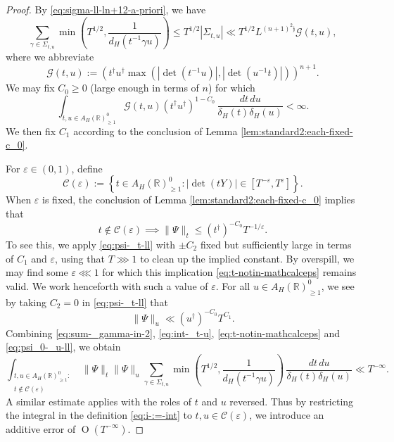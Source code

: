 \documentclass[reqno]{amsart}
\def\eps{\varepsilon}
\def\O{\operatorname{O}}
\theoremstyle{plain} \newtheorem{theorem} {Theorem}
\theoremstyle{definition} \newtheorem{definition} [theorem] {Definition}
\theoremstyle{itplain} %
\numberwithin{equation}{section}
\numberwithin{theorem}{section}
\renewcommand{\geq}{\geqslant}
\renewcommand{\leq}{\leqslant}
\begin{document}
\begin{proof}
  By \eqref{eq:sigma-ll-ln+12-a-priori}, we have
  \begin{equation}\label{eq:sum-_gamma-in-2}
    \sum _{\gamma \in \Sigma_{t,u}}
    \min \left( T^{1/2}, \frac{1}{d_H(t^{-1} \gamma u)} \right)
    \leq T^{1/2} |\Sigma_{t,u}| \ll
    T^{1/2}
    L^{(n+1)^2 \mathfrak{j}} \mathcal{G}(t,u),
  \end{equation}
  where we abbreviate
  \begin{equation*}
    \mathcal{G}(t,u)  := \left( t ^\dagger u ^\dagger \max(|\det(t^{-1} u)|, |\det(u^{-1} t)|) \right)^{n+1}.
  \end{equation*}
  We may fix $C_0 \geq 0$ (large enough in terms of $n$) for which
  \begin{equation}\label{eq:int-_t-u}
    \int _{t, u \in A_H(\mathbb{R})^0_{\geq 1}}
    \mathcal{G}(t,u) (t ^\dagger u ^\dagger )^{1- C_0} \, \frac{d t \, d u}{\delta_H(t) \delta_H(u)} < \infty.
  \end{equation}
  We then fix $C_1$ according to the conclusion of Lemma \ref{lem:standard2:each-fixed-c_0}.

  For $\eps \in (0,1)$, define
  \begin{equation*}
    \mathcal{C}(\eps) := \left\{ t \in A_H(\mathbb{R})^0_{\geq 1} : \left\lvert \det (t Y ) \right\rvert \in [T ^{- \eps }, T ^\eps ]\right\}.
  \end{equation*}
  When $\eps$ is fixed, the conclusion of Lemma \ref{lem:standard2:each-fixed-c_0} implies that
  \begin{equation}\label{eq:t-notin-mathcalceps}
    t \notin \mathcal{C}(\eps)
    \implies
    \|\Psi\|_t
    \leq
    (t ^\dagger )^{-C_0} T^{-1/\eps}.
  \end{equation}
  To see this, we apply \eqref{eq:psi-_t-ll} with $\pm C_2$ fixed but sufficiently large in terms of $C_1$ and $\eps $, using that $T \ggg 1$ to clean up the implied constant.  By overspill, we may find some $\eps \lll 1$ for which this implication \eqref{eq:t-notin-mathcalceps} remains valid.  We work henceforth with such a value of $\eps$.  For all $u \in A_H(\mathbb{R})^0_{\geq 1}$, we see by taking $C_2 = 0$ in  \eqref{eq:psi-_t-ll} that
  \begin{equation}\label{eq:psi_0-_u-ll}
    \|\Psi\|_u \ll (u ^\dagger )^{-C_0} T^{C_1}.
  \end{equation}
  Combining \eqref{eq:sum-_gamma-in-2}, \eqref{eq:int-_t-u}, \eqref{eq:t-notin-mathcalceps} and \eqref{eq:psi_0-_u-ll}, we obtain
  \begin{equation*}
    \int _{
      \substack{
        t, u \in A_H(\mathbb{R})^0_{\geq 1} :  \\
        t \notin \mathcal{C}(\eps)
      }
    }
    \|\Psi\|_t \|\Psi\|_u
    \sum _{\gamma \in \Sigma_{t,u}}
    \min \left( T^{1/2}, \frac{1}{d_H(t^{-1} \gamma u)} \right) \, \frac{d t \, d u}{\delta_H(t) \delta_H(u)}
    \ll T^{-\infty}.
  \end{equation*}
  A similar estimate applies with the roles of $t$ and $u$ reversed.  Thus by restricting the integral in the definition \eqref{eq:i-:=-int} to $t,u \in \mathcal{C}(\eps)$, we introduce an additive error of $\O(T^{-\infty})$.


\end{proof}
\end{document}
